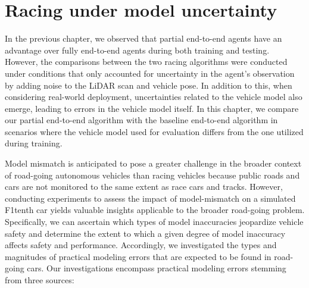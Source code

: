 \chapter{Racing under model uncertainty}\label{chp:racing}


In the previous chapter, we observed that partial end-to-end agents have an advantage over fully end-to-end agents during both training and testing.
However, the comparisons between the two racing algorithms were conducted under conditions that only accounted for uncertainty in the agent's observation by adding noise to the LiDAR scan and vehicle pose. 
In addition to this, when considering real-world deployment, uncertainties related to the vehicle model also emerge, leading to errors in the vehicle model itself. 
In this chapter, we compare our partial end-to-end algorithm with the baseline end-to-end algorithm in scenarios where the vehicle model used for evaluation differs from the one utilized during training.






Model mismatch is anticipated to pose a greater challenge in the broader context of road-going autonomous vehicles than racing vehicles because public roads and cars are not monitored to the same extent as race cars and tracks.
However, conducting experiments to assess the impact of model-mismatch on a simulated F1tenth car yields valuable insights applicable to the broader road-going problem. 
Specifically, we can ascertain which types of model inaccuracies jeopardize vehicle safety and determine the extent to which a given degree of model inaccuracy affects safety and performance. 
Accordingly, we investigated the types and magnitudes of practical modeling errors that are expected to be found in road-going cars. 
Our investigations encompass practical modeling errors stemming from three sources:

